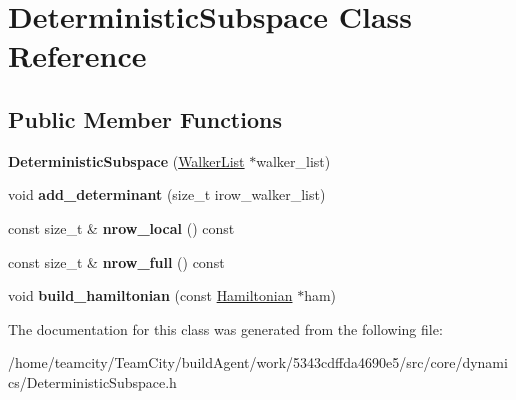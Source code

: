 \hypertarget{classDeterministicSubspace}{}\section{Deterministic\+Subspace Class Reference}
\label{classDeterministicSubspace}
\subsection*{Public Member Functions}
\begin{DoxyCompactItemize}
\item 
{\bfseries Deterministic\+Subspace} (\hyperlink{structWalkerList}{Walker\+List} $\ast$walker\+\_\+list)\hypertarget{classDeterministicSubspace_a6872430fe91bcd2d55c23f13929e7ab1}{}\label{classDeterministicSubspace_a6872430fe91bcd2d55c23f13929e7ab1}

\item 
void {\bfseries add\+\_\+determinant} (size\+\_\+t irow\+\_\+walker\+\_\+list)\hypertarget{classDeterministicSubspace_aea0ef2bad6d6ab5c1aea0a4da64e0818}{}\label{classDeterministicSubspace_aea0ef2bad6d6ab5c1aea0a4da64e0818}

\item 
const size\+\_\+t \& {\bfseries nrow\+\_\+local} () const \hypertarget{classDeterministicSubspace_a76c8d0089e5745373613169947bcf511}{}\label{classDeterministicSubspace_a76c8d0089e5745373613169947bcf511}

\item 
const size\+\_\+t \& {\bfseries nrow\+\_\+full} () const \hypertarget{classDeterministicSubspace_a4711dc161d4f4f5d67d164e383834edb}{}\label{classDeterministicSubspace_a4711dc161d4f4f5d67d164e383834edb}

\item 
void {\bfseries build\+\_\+hamiltonian} (const \hyperlink{classHamiltonian}{Hamiltonian} $\ast$ham)\hypertarget{classDeterministicSubspace_ae53f2cdc9e1730bfaecd5a2b0cb8ce70}{}\label{classDeterministicSubspace_ae53f2cdc9e1730bfaecd5a2b0cb8ce70}

\end{DoxyCompactItemize}


The documentation for this class was generated from the following file\+:\begin{DoxyCompactItemize}
\item 
/home/teamcity/\+Team\+City/build\+Agent/work/5343cdffda4690e5/src/core/dynamics/Deterministic\+Subspace.\+h\end{DoxyCompactItemize}
